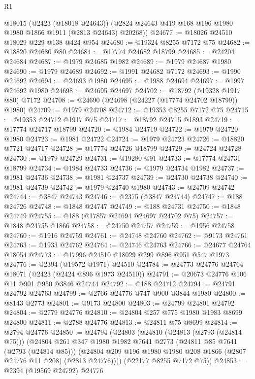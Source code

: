 \begin{lexlean}{R1}
\begin{coremodule}
      @18015
      (@2423 (@18018 @24643))
      (@2824 @24643 @419 @168 @196 @1980 @1980 @1866 @1911 (@2813 @24643) @20268))
@24677 := @18026 @24510 @18029 @229 @138 @424 @954
@24680 := @19324 @8255 @7172 @75
@24682 := @18820 @24680 @80
@24684 := @17774 @24682 @18799
@24685 := @24204 @24684
@24687 := @1979 @24685 @1982
@24689 := @1979 @24687 @1980
@24690 := @1979 @24689
@24692 := @1991 @24682 @7172
@24693 := @1990 @24692
@24694 := @24693 @1980
@24695 := @1988 @24694
@24697 := @1997 @24692 @1980
@24698 := @24695 @24697
@24702 := @18792 (@19328 @1917 @80) @7172
@24708 := @24690 (@24698 (@24227 (@17774 @24702 @18799)) @1980)
@24709 := @1979 @24708
@24712 := @19353 @8255 @7172 @75
@24715 := @19353 @24712 @1917 @75
@24717 := @18792 @24715 @1893
@24719 := @17774 @24717 @18799
@24720 := @1984 @24719
@24722 := @1979 @24720 @1980
@24723 := @1981 @24722
@24724 := @1979 @24723
@24726 := @18820 @7721 @24717
@24728 := @17774 @24726 @18799
@24729 := @24724 @24728
@24730 := @1979 @24729
@24731 := @19280 @91
@24733 := @17774 @24731 @18799
@24734 := @1984 @24733
@24736 := @1979 @24734 @1982
@24737 := @1981 @24736
@24738 := @1981 @24737
@24739 := @24730 @24738
@24740 := @1981 @24739
@24742 := @1979 @24740 @1980
@24743 := @24709 @24742
@24744 := @3847 @24743
@24746 := @2375 (@3847 @24744)
@24747 := @188 @24726
@24748 := @1848 @24747
@24749 := @188 @24731
@24750 := @1848 @24749
@24755 := @188 (@17857 @24694 @24697 @24702 @75)
@24757 := @1848 @24755 @1866
@24758 := @24750 @24757
@24759 := @1956 @24758
@24760 := @1916 @24759
@24761 := @24748 @24760
@24762 := @9173 @24761
@24763 := @1933 @24762
@24764 := @24746 @24763
@24766 := @24677 @24764 @18054
@24773 := @17996 @24510 @18029 @299 @896 @951 @547 @1973
@24776 := @2394 (@19572 @1971) @24510
@24784 := @24773 @24776 @24764 @18071 (@2423 (@2424 @896 @1973 @24510))
@24791 := @20673 @24776 @106 @11 @901 @950 @3846 @24744
@24792 := @188 @24712
@24794 := @24791 @24792 @24763
@24799 := @2766 @24776 @747 @900 @3844 @1980
@24800 := @8143 @2773
@24801 := @9173 @24800
@24803 := @24799 @24801 @24792
@24804 := @2779 @24776
@24810 := @24804 @257 @775 @1980 @1983 @8699 @24800
@24811 := @2788 @24776
@24813 := @24811 @75 @8699
@24814 := @2794 @24776
@24850 := @24794
    (@24803
      (@24810
        (@24813 (@2793 (@24814 @75)))
        (@24804
          @261
          @347
          @1980
          @1982
          @7641
          @2773
          (@24811 @85 @7641 (@2793 (@24814 @85)))
          (@24804 @209 @196 @1980 @1980 @208 @1866 (@2807 @24776 @11 @208) (@2813 @24776))))
      (@22177 @8255 @7172 @75))
@24853 := @2394 (@19569 @24792) @24776

\end{coremodule}
\end{lexlean}
